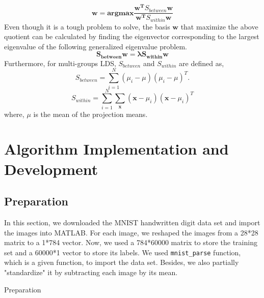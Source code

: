 \documentclass{article}
\begin{document}
\[
\mathbf{w} = \textbf{argmax}\frac{\mathbf{w^T}S_{between}\mathbf{w}}{\mathbf{w^T}S_{within}\mathbf{w}}
\]
Even though it is a tough problem to solve, the basis $\mathbf{w}$ that maximize the above quotient can be calculated by finding the eigenvector corresponding to the largest eigenvalue of the following generalized eigenvalue problem.
\[
\mathbf{S_{between} w = \lambda S_{within}w}
\]
Furthermore, for multi-groups LDS, $S_{between}$ and $S_{within}$ are defined as,
\[
S_{between} = \sum_{i=1}^N(\mu_i - \mu)(\mu_i - \mu)^T.
\]
\[
S_{within} = \sum_{i=1}^N\sum_{\mathbf{x}}(\mathbf{x}-\mu_i)(\mathbf{x}-\mu_i)^T
\]
where, $\mu$ is the mean of the projection means.
\section{Algorithm Implementation and Development}
\subsection{Preparation}
In this section, we downloaded the MNIST handwritten digit data set and import the images into MATLAB. For each image, we reshaped the images from a 28*28 matrix to a 1*784 vector. Now, we used a 784*60000 matrix to store the training set and a 60000*1 vector to store its labels. We used \texttt{mnist\_parse} function, which is a given function, to import the data set. Besides, we also partially "standardize" it by subtracting each image by its mean.
\begin{algorithm}
\begin{algorithmic}
\end{algorithmic}
\caption{Preparation}
\end{algorithm}
\end{document}
